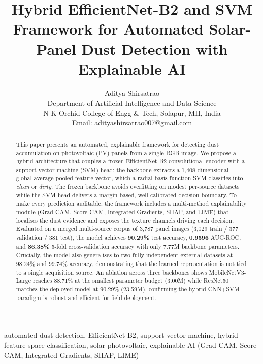 \documentclass{IEEEtran}
\begin{document}
\title{\textbf{Hybrid EfficientNet-B2 and SVM Framework for Automated Solar-Panel Dust Detection with Explainable AI}}

\author{
Aditya Shirsatrao\\
Department of Artificial Intelligence and Data Science\\
N K Orchid College of Engg \& Tech, Solapur, MH, India\\
Email: adityashirsatrao007@gmail.com
}

\maketitle

\begin{abstract}
This paper presents an automated, explainable framework for detecting dust accumulation on photovoltaic (PV) panels from a single RGB image. We propose a hybrid architecture that couples a frozen EfficientNet-B2 convolutional encoder with a support vector machine (SVM) head: the backbone extracts a 1,408-dimensional global-average-pooled feature vector, which a radial-basis-function SVM classifies into \emph{clean} or \emph{dirty}. The frozen backbone avoids overfitting on modest per-source datasets while the SVM head delivers a margin-based, well-calibrated decision boundary. To make every prediction auditable, the framework includes a multi-method explainability module (Grad-CAM, Score-CAM, Integrated Gradients, SHAP, and LIME) that localises the dust evidence and exposes the texture channels driving each decision. Evaluated on a merged multi-source corpus of 3,787 panel images (3,029 train / 377 validation / 381 test), the model achieves \textbf{90.29\%} test accuracy, \textbf{0.9596} AUC-ROC, and \textbf{86.38\%} 5-fold cross-validation accuracy with only 7.77M backbone parameters. Crucially, the model also generalises to two fully independent external datasets at 98.24\% and 99.74\% accuracy, demonstrating that the learned representation is not tied to a single acquisition source. An ablation across three backbones shows MobileNetV3-Large reaches 88.71\% at the smallest parameter budget (3.00M) while ResNet50 matches the deployed model at 90.29\% (23.59M), confirming the hybrid CNN+SVM paradigm is robust and efficient for field deployment.
\end{abstract}

\begin{IEEEkeywords}
automated dust detection, EfficientNet-B2, support vector machine, hybrid feature-space classification, solar photovoltaic, explainable AI (Grad-CAM, Score-CAM, Integrated Gradients, SHAP, LIME)
\end{IEEEkeywords}
\end{document}
